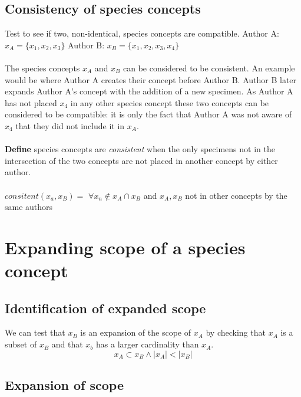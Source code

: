 \documentclass{article}
\begin{document}
   \subsection{Consistency of species concepts}
   Test to see if two, non-identical, species concepts are compatible.
   \newline\newline
   Author A: $x_A = \{x_1, x_2, x_3\}$ \newline
   Author B: $x_B = \{x_1, x_2, x_3, x_4\}$ 
   \paragraph{}
   The species concepts $x_A$ and $x_B$ can be considered to be consistent. An example would be where Author A creates their concept before Author B. Author B later expands Author A's concept with the addition of a new specimen. As Author A has not placed $x_4$ in any other species concept these two concepts can be considered to be compatible: it is only the fact that Author A was not aware of $x_4$ that they did not include it in $x_A$.
   \paragraph{}
   \textbf{Define}  species concepts are \textit{consistent} when the only specimens not in the intersection of the two concepts are not placed in another concept by either author.
   \paragraph{}
   $consitent(x_a,x_B) =$ $\forall x_n \notin x_A \cap x_B$  and $x_A, x_B$ not in other concepts by the same authors
   
   \section{Expanding scope of a species concept}
   \subsection{Identification of expanded scope}
   We can test that $x_B$ is an expansion of the scope of $x_A$ by checking that $x_A$ is a subset of $x_B$ and that $x_b$ has a larger cardinality than $x_A$.
   \[x_A \subset x_B \land \left|x_A\right| < \left|x_B\right|\]
   
   \subsection{Expansion of scope}
\end{document}
